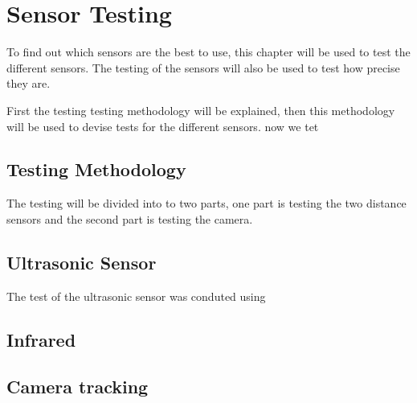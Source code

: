 \section{Sensor Testing}
To find out which sensors are the best to use, this chapter will be used to test
the different sensors. The testing of the sensors will also be used to test how
precise they are.\nl

First the testing testing methodology will be explained, then this methodology
will be used to devise tests for the different sensors. now we tet

\subsection{Testing Methodology}
The testing will be divided into to two parts, one part is testing the two
distance sensors and the second part is testing the camera. 

\subsection{Ultrasonic Sensor}
The test of the ultrasonic sensor was conduted using 

\subsection{Infrared}

\subsection{Camera tracking}%
